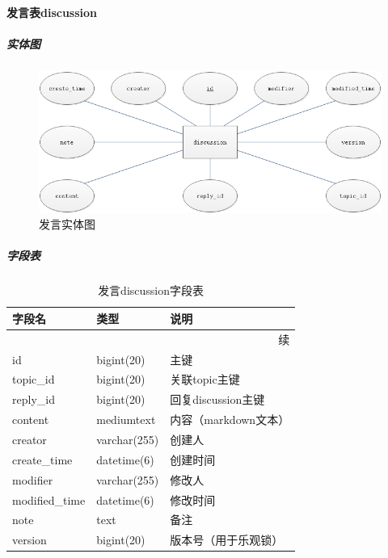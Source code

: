 \documentclass[titlepage,UTF8,linespread=1.5]{ctexart}
\begin{document}
\paragraph{发言表discussion}
\subparagraph{实体图}
\begin{figure}[H]
    \centering
    \includegraphics[width=140mm]{entity-discussion.png}
    \caption{发言实体图}
    \label{fig:entity-discussion}
\end{figure}
\subparagraph{字段表}
\begin{longtable}{|p{10em}|p{6em}|p{15em}|}
    \caption{发言discussion字段表}\label{tab:table_discussion} \\\hline
    字段名         & 类型         & 说明                       \\\hline
    \endfirsthead
    \multicolumn{3}{r}{{续\tablename\thetable{}}}              \\\hline
    \endhead
    id             & bigint(20)   & 主键                       \\\hline
    topic\_id      & bigint(20)   & 关联topic主键              \\\hline
    reply\_id      & bigint(20)   & 回复discussion主键         \\\hline
    content        & mediumtext   & 内容（markdown文本）       \\\hline
    creator        & varchar(255) & 创建人                     \\\hline
    create\_time   & datetime(6)  & 创建时间                   \\\hline
    modifier       & varchar(255) & 修改人                     \\\hline
    modified\_time & datetime(6)  & 修改时间                   \\\hline
    note           & text         & 备注                       \\\hline
    version        & bigint(20)   & 版本号（用于乐观锁）       \\\hline
\end{longtable}\par
\end{document}
